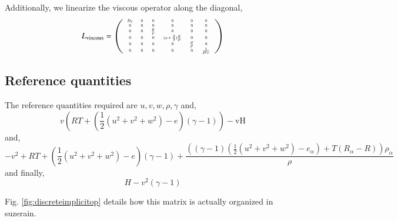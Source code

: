 \documentclass[letterpaper,11pt,nointlimits,reqno,draft]{amsart}
\begin{document}
Additionally, we linearize the viscous operator along the diagonal,
\begin{equation}
\tiny
L_{\text{viscous}} = 
\left(
\begin{array}{cccccc}
 D_s & 0 & 0 & 0 & 0 & 0 \\
 0 & 0 & 0 & 0 & 0 & 0 \\
 0 & 0 & \frac{\mu}{\rho} & 0 & 0 & 0 \\
 0 & 0 & 0 & (\alpha+\frac{4}{3})\frac{\mu}{\rho} & 0 & 0 \\
 0 & 0 & 0 & 0 & \frac{\mu}{\rho} & 0 \\
 0 & 0 & 0 & 0 & 0 & \frac{1}{\rho c_v} \\
\end{array}
\right)
\end{equation}

\subsection{Reference quantities}
The reference quantities required are $u,v,w,\rho,\gamma$ and,
\begin{equation}
v \left(R T+\left(\frac{1}{2} \left(u^2+v^2+w^2\right)-e\right) (\gamma -1)\right)-\text{vH}
\end{equation}
and,
\begin{equation}
-v^2+R T+\left(\frac{1}{2} \left(u^2+v^2+w^2\right)-e\right) (\gamma -1)+\frac{\left((\gamma -1) \left(\frac{1}{2} \left(u^2+v^2+w^2\right)-e_{\alpha }\right)+T
   \left(R_{\alpha }-R\right)\right) \rho _{\alpha }}{\rho }
\end{equation}
and finally,
\begin{equation}
H-v^2 (\gamma -1)
\end{equation}

Fig. \ref{fig:discreteimplicitop} details how this matrix is actually organized in
suzerain. 
\end{document}
